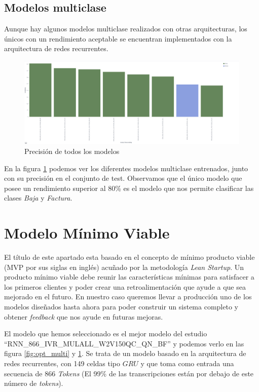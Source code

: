 \subsection{Modelos multiclase}

Aunque hay algunos modelos multiclase realizados con otras arquitecturas, los únicos con un rendimiento aceptable se encuentran implementados con la arquitectura de redes recurrentes.

\begin{figure}[!ht]
	\centering
	\includegraphics[width=1\textwidth]{images/super/resumen_multi}
	\caption{Precisión de todos los modelos}
	\label{fig:resumen_multi}
\end{figure}


En la figura \ref{fig:resumen_multi}  podemos ver los diferentes modelos multiclase entrenados, junto con su precisión en el conjunto de test. Observamos que el único modelo que posee un rendimiento superior al 80\% es el modelo que nos permite clasificar las clases \textit{Baja} y \textit{Factura}.


\section{Modelo Mínimo Viable}
\label{section:super:mvm}
El título de este apartado esta basado en el concepto de mínimo producto viable (MVP por sus siglas en inglés) acuñado por la metodología \textit{Lean Startup}. Un producto mínimo viable debe reunir las características mínimas para satisfacer a los primeros clientes y poder crear una retroalimentación que ayude a que sea mejorado en el futuro. En nuestro caso queremos llevar a producción uno de los modelos diseñados hasta ahora para poder construir un sistema completo y obtener \textit{feedback} que nos ayude en futuras mejoras.

El modelo que hemos seleccionado es el mejor modelo del estudio ``RNN\_866\_IVR\_MULALL\_W2V150QC\_QN\_BF'' y podemos verlo en las figura \ref{fig:opt_multi} y \ref{fig:resumen_multi}. Se trata de un modelo basado en la arquitectura de redes recurrentes, con 149 celdas tipo $GRU$ y que toma como entrada una secuencia de 866 \textit{Tokens} (El 99\% de las transcripciones están por debajo de este número de \textit{tokens}).


